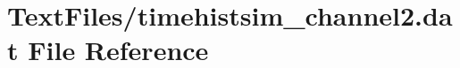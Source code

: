 \hypertarget{TextFiles_2timehistsim__channel2_8dat}{}\section{Text\+Files/timehistsim\+\_\+channel2.dat File Reference}
\label{TextFiles_2timehistsim__channel2_8dat}
